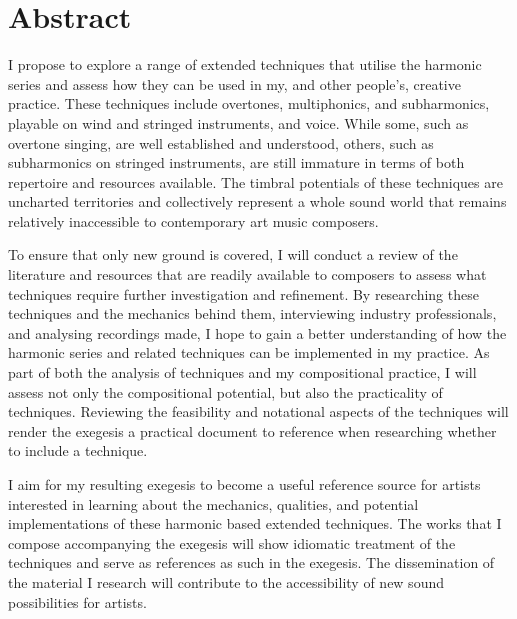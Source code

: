 \chapter*{Abstract}

I propose to explore a range of extended techniques that utilise the harmonic series and assess how they can be used in my, and other people’s, creative practice. These techniques include overtones, multiphonics, and subharmonics, playable on wind and stringed instruments, and voice. While some, such as overtone singing, are well established and understood, others, such as subharmonics on stringed instruments, are still immature in terms of both repertoire and resources available.  The timbral potentials of these techniques are uncharted territories and collectively represent a whole sound world that remains relatively inaccessible to contemporary art music composers.

To ensure that only new ground is covered, I will conduct a review of the literature and resources that are readily available to composers to assess what techniques require further investigation and refinement. By researching these techniques and the mechanics behind them, interviewing industry professionals, and analysing recordings made, I hope to gain a better understanding of how the harmonic series and related techniques can be implemented in my practice. As part of both the analysis of techniques and my compositional practice, I will assess not only the compositional potential, but also the practicality of techniques. Reviewing the feasibility and notational aspects of the techniques will render the exegesis a practical document to reference when researching whether to include a technique.

I aim for my resulting exegesis to become a useful reference source for artists interested in learning about the mechanics, qualities, and potential implementations of these harmonic based extended techniques. The works that I compose accompanying the exegesis will show idiomatic treatment of the techniques and serve as references as such in the exegesis. The dissemination of the material I research will contribute to the accessibility of new sound possibilities for artists.